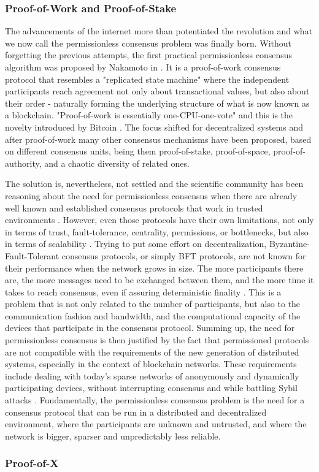 \subsubsection{Proof-of-Work and Proof-of-Stake}

The advancements of the internet more than potentiated the revolution and what we now call the permissionless consensus problem was finally born. Without forgetting the previous attempts, the first practical permissionless consensus algorithm was proposed by Nakamoto in \cite{nakamoto2008bitcoin}. It is a proof-of-work consensus protocol that resembles a "replicated state machine" where the independent participants reach agreement not only about transactional values, but also about their order - naturally forming the underlying structure of what is now known as a blockchain. "Proof-of-work is essentially one-CPU-one-vote" and this is the novelty introduced by Bitcoin \cite{pass2016hybrid,pass2016hybrid2}. The focus shifted for decentralized systems and after proof-of-work many other consensus mechanisms have been proposed, based on different consensus units, being them proof-of-stake, proof-of-space, proof-of-authority, and a chaotic diversity of related ones.

The solution is, nevertheless, not settled and the scientific community has been reasoning about the need for permissionless consensus when there are already well known and established consensus protocols that work in trusted environments \cite{castro1999practical, miller2016honey}. However, even those protocols have their own limitations, not only in terms of trust, fault-tolerance, centrality, permissions, or bottlenecks, but also in terms of scalability \cite{miller2016honey}. Trying to put some effort on decentralization, Byzantine-Fault-Tolerant consensus protocols, or simply BFT protocols, are not known for their performance when the network grows in size. The more participants there are, the more messages need to be exchanged between them, and the more time it takes to reach consensus, even if assuring deterministic finality \cite{decker2016bitcoin}. This is a problem that is not only related to the number of participants, but also to the communication fashion and bandwidth, and the computational capacity of the devices that participate in the consensus protocol. Summing up, the need for permissionless consensus is then justified by the fact that permissioned protocols are not compatible with the requirements of the new generation of distributed systems, especially in the context of blockchain networks. These requirements include dealing with today's sparse networks of anonymously and dynamically participating devices, without interrupting consensus and while battling Sybil attacks \cite{8629877, survey-dist-consensus}. Fundamentally, the permissionless consensus problem is the need for a consensus protocol that can be run in a distributed and decentralized environment, where the participants are unknown and untrusted, and where the network is bigger, sparser and unpredictably less reliable.

\subsubsection{Proof-of-X}